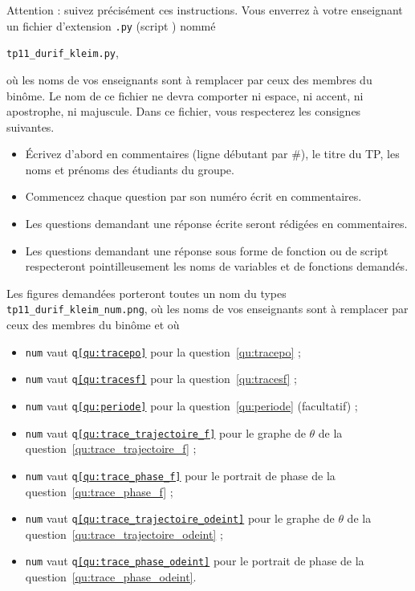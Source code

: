 Attention : suivez précisément ces instructions. Vous enverrez à votre enseignant un fichier d'extension  \texttt{.py} (script \python) nommé
\begin{center}
  \texttt{tp11\_durif\_kleim.py},
\end{center}
 où les noms de vos enseignants sont à remplacer par ceux des membres du binôme. Le nom de ce 
fichier ne devra comporter ni espace, ni accent, ni apostrophe, ni majuscule.
Dans ce fichier, vous respecterez les consignes suivantes.
\begin{itemize}
  \item \'Ecrivez d'abord en commentaires (ligne débutant par \#), le titre du TP, les noms et prénoms des étudiants du groupe.
  \item Commencez chaque question par son numéro écrit en commentaires.
  \item Les questions demandant une réponse écrite seront rédigées en commentaires.
  \item Les questions demandant une réponse sous forme de fonction ou de script respecteront pointilleusement les noms de variables et de fonctions demandés.
\end{itemize} 

Les figures demandées porteront toutes un nom du types \texttt{tp11\_durif\_kleim\_num.png}, où les noms de vos enseignants sont à remplacer par ceux des membres du binôme et où
\begin{itemize}
  \item \texttt{num} vaut \texttt{q\ref{qu:tracepo}} pour la question~\ref{qu:tracepo} ;
  \item \texttt{num} vaut \texttt{q\ref{qu:tracesf}} pour la question~\ref{qu:tracesf} ;
  \item \texttt{num} vaut \texttt{q\ref{qu:periode}} pour la question~\ref{qu:periode} (facultatif) ;
  \item \texttt{num} vaut \texttt{q\ref{qu:trace_trajectoire_f}} pour le graphe de $\theta$ de la question~\ref{qu:trace_trajectoire_f} ;
  \item \texttt{num} vaut \texttt{q\ref{qu:trace_phase_f}} pour le portrait de phase de la question~\ref{qu:trace_phase_f} ;
  \item \texttt{num} vaut \texttt{q\ref{qu:trace_trajectoire_odeint}} pour le graphe de $\theta$ de la question~\ref{qu:trace_trajectoire_odeint} ;
  \item \texttt{num} vaut \texttt{q\ref{qu:trace_phase_odeint}} pour le portrait de phase de la question~\ref{qu:trace_phase_odeint}.
\end{itemize}